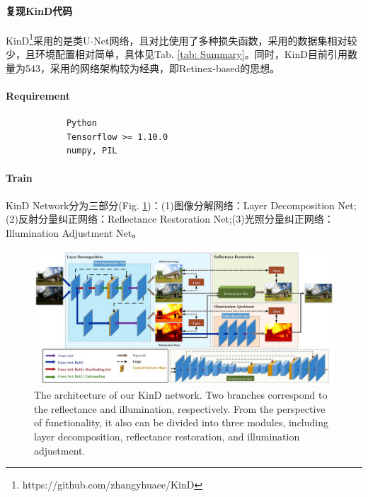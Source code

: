 \documentclass[letterpaper,12pt]{article}
\begin{document}
		\paragraph{复现KinD代码}
		
		KinD\footnote{https://github.com/zhangyhuaee/KinD}采用的是类U-Net网络，且对比使用了多种损失函数，采用的数据集相对较少，且环境配置相对简单，具体见Tab. \ref{tab: Summary}。同时，KinD\cite{10.1145/3343031.3350926}目前引用数量为543，采用的网络架构较为经典，即Retinex-based的思想。
		
		\paragraph{Requirement}
		
		\lstset{language=python,breaklines=true}
		\begin{lstlisting}
			Python
			Tensorflow >= 1.10.0
			numpy, PIL
		\end{lstlisting}
		
		\paragraph{Train}
		
		KinD Network分为三部分(Fig. \ref{fig: network})：(1)图像分解网络：Layer Decomposition Net;(2)反射分量纠正网络：Reflectance Restoration Net;(3)光照分量纠正网络：Illumination Adjustment Net。
		
		\begin{figure}[htbp]
			\centering \includegraphics[width=0.8\columnwidth]{network}
			\captionsetup{font=scriptsize}
			\caption{
				\label{fig: network} %
				The architecture of our KinD network. Two branches correspond to the reflectance and illumination, respectively. From the perspective of functionality, it also can be divided into three modules, including layer decomposition, reflectance restoration, and illumination adjustment.
			}
		\end{figure}
		
\end{document}
